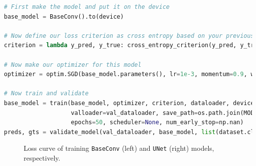 \documentclass[11pt]{article}
\begin{document}

\begin{lstlisting}[language=Python, basicstyle=\scriptsize]
# First make the model and put it on the device
base_model = BaseConv().to(device)

# Now define our loss criterion as cross entropy based on your previous code
criterion = lambda y_pred, y_true: cross_entropy_criterion(y_pred, y_true, class_weights, device)

# Now make our optimizer for this model
optimizer = optim.SGD(base_model.parameters(), lr=1e-3, momentum=0.9, weight_decay=0.01)

# Now train and validate
base_model = train(base_model, optimizer, criterion, dataloader, device, 
                   valloader=val_dataloader, save_path=os.path.join(MODEL_PATH, str(base_model)),
                   epochs=50, scheduler=None, num_early_stop=np.nan)
preds, gts = validate_model(val_dataloader, base_model, list(dataset.classes), device)
\end{lstlisting}

\begin{figure}[h]
    \centering
    \qquad
    \caption{Loss curve of training \texttt{BaseConv} (left) and \texttt{UNet} (right) models, respectively.}
    \label{fig:loss-BaseConv-UNet]}
\end{figure}
\end{document}
